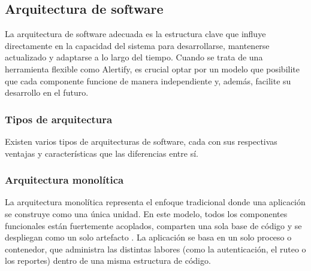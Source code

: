 

\subsection{Arquitectura de software}
La arquitectura de software adecuada es la estructura clave que influye directamente en la capacidad del sistema para desarrollarse, mantenerse actualizado y adaptarse a lo largo del tiempo. Cuando se trata de una herramienta flexible como Alertify, es crucial optar por un modelo que posibilite que cada componente funcione de manera independiente y, además, facilite su desarrollo en el futuro.
\subsubsection{Tipos de arquitectura}
Existen varios tipos de arquitecturas de software, cada con sus respectivas ventajas y características que las diferencias entre sí.
\subsubsection*{\hspace{0.7cm}Arquitectura monolítica}
La arquitectura monolítica representa el enfoque tradicional donde una aplicación se construye como una única unidad. En este modelo, todos los componentes funcionales están fuertemente acoplados, comparten una sola base de código y se despliegan como un solo artefacto \cite{blinowski2022monolithic}. La aplicación se basa en un solo proceso o contenedor, que administra las distintas labores (como la autenticación, el ruteo o los reportes) dentro de una misma estructura de código.
